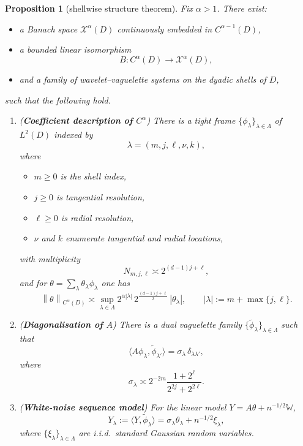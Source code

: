 \documentclass[11pt]{article}
\newtheorem{proposition}[theorem]{Proposition}
\newcommand{\1}{\mathbf 1}
\newcommand{\la}{\langle}
\newcommand{\ra}{\rangle}
\newcommand{\norm}[1]{\left\|#1\right\|}
\begin{document}
\begin{proposition}[shellwise structure theorem]\label{prop:shell-structure}
Fix $\alpha>1$. There exist:
\begin{itemize}[leftmargin=2em]
\item a Banach space $\mathcal X^\alpha(D)$ continuously embedded in $C^{\alpha-1}(D)$,
\item a bounded linear isomorphism
\[
B:C^\alpha(D)\longrightarrow \mathcal X^\alpha(D),
\]
\item and a family of wavelet--vaguelette systems on the dyadic shells of $D$,
\end{itemize}
such that the following hold.

\begin{enumerate}[label=(\roman*),leftmargin=2em]
\item (\textbf{Coefficient description of $C^\alpha$}) There is a tight frame $\{\phi_\lambda\}_{\lambda\in\Lambda}$ of $L^2(D)$ indexed by
\[
\lambda=(m,j,\ell,\nu,k),
\]
where
\begin{itemize}
\item $m\ge0$ is the shell index,
\item $j\ge0$ is tangential resolution,
\item $\ell\ge0$ is radial resolution,
\item $\nu$ and $k$ enumerate tangential and radial locations,
\end{itemize}
with multiplicity
\begin{equation}\label{eq:count}
N_{m,j,\ell}\asymp 2^{(d-1)j+\ell},
\end{equation}
and for $\theta=\sum_{\lambda}\theta_\lambda\phi_\lambda$ one has
\begin{equation}\label{eq:holder-sequence}
\norm{\theta}_{C^\alpha(D)}
\asymp
\sup_{\lambda\in\Lambda}
2^{\alpha|\lambda|}
\,2^{\frac{(d-1)j+\ell}{2}}
\,|\theta_\lambda|,
\qquad
|\lambda|:=m+\max\{j,\ell\}.
\end{equation}

\item (\textbf{Diagonalisation of $A$}) There is a dual vaguelette family $\{\widetilde\phi_\lambda\}_{\lambda\in\Lambda}$ such that
\begin{equation}\label{eq:diag}
\la A\phi_\lambda,\widetilde\phi_{\lambda'}\ra=\sigma_\lambda\,\delta_{\lambda\lambda'},
\end{equation}
where
\begin{equation}\label{eq:singular-values}
\sigma_\lambda
\asymp
2^{-2m}\frac{1+2^\ell}{2^{2j}+2^{2\ell}}.
\end{equation}

\item (\textbf{White-noise sequence model}) For the linear model $Y=A\theta+n^{-1/2}\mathbb W$,
\[
Y_\lambda:=\la Y,\widetilde\phi_\lambda\ra
=
\sigma_\lambda \theta_\lambda+n^{-1/2}\xi_\lambda,
\]
where $\{\xi_\lambda\}_{\lambda\in\Lambda}$ are i.i.d.\ standard Gaussian random variables.
\end{enumerate}
\end{proposition}
\end{document}

